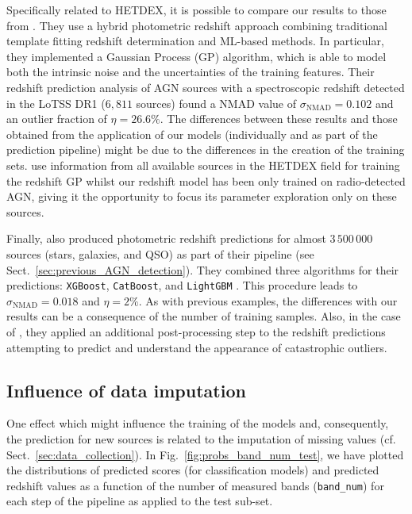\documentclass{aa}
\begin{document}
Specifically related to HETDEX, it is possible to compare our results to those from \citet{2019A&A...622A...3D}. They use a hybrid photometric redshift approach combining  traditional template fitting redshift determination and ML-based methods. In particular, they implemented a Gaussian Process (GP) algorithm, which is able to model both the intrinsic noise and the uncertainties of the training features. Their redshift prediction analysis of 
AGN sources with a spectroscopic redshift detected in the LoTSS DR1 ($6,811$ sources) found a NMAD value of ${\sigma_{\mathrm{NMAD}} = 0.102}$ and an outlier fraction of ${\eta = 26.6 \%}$.
The differences between these results and those obtained from the application of our models (individually and as part of the prediction pipeline) might be due to the differences in the creation of the training sets. \citet{2019A&A...622A...3D} use information from all available sources in the HETDEX field for training the redshift GP whilst our redshift model has been only trained on radio-detected AGN, giving it the opportunity to focus its parameter exploration only on these sources.

Finally, \citet{2022A&A...666A..87C} also produced photometric redshift predictions for almost $3\,500\,000$ sources (stars, galaxies, and QSO) as part of their pipeline (see Sect.~\ref{sec:previous_AGN_detection}). They combined three algorithms for their predictions: \texttt{XGBoost}, \texttt{CatBoost}, and \texttt{LightGBM} \citep{NIPS2017_6449f44a}. This procedure leads to ${\sigma_{\mathrm{NMAD}} = 0.018}$ and ${\eta = 2 \%}$. As with previous examples, the differences with our results can be a consequence of the number of training samples. Also, in the case of \citet{2022A&A...666A..87C}, they applied an additional post-processing step to the redshift predictions attempting to predict and understand the appearance of catastrophic outliers.

\subsection{Influence of data imputation}\label{sec:band_num_trends}

One effect which might influence the training of the models and, consequently, the prediction for new sources is related to the imputation of missing values (cf. Sect.~\ref{sec:data_collection}). In Fig.~\ref{fig:probs_band_num_test}, we have plotted the distributions of predicted scores (for classification models) and predicted redshift values as a function of the number of measured bands (\texttt{band\_num}) for each step of the pipeline as applied to the test sub-set.
\end{document}
